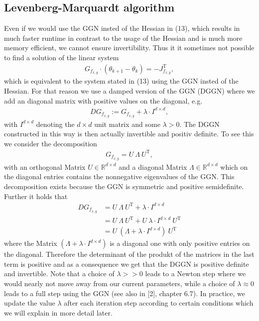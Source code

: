 \documentclass[conference]{IEEEtran}
\begin{document}
\subsection{Levenberg-Marquardt algorithm }
Even if we would use the GGN insted of the Hessian in (13), which results in much faster runtime in contrast to the usage of the Hessian and is much more memory efficient, we cannot ensure invertibility. Thus it it sometimes not possible to find a solution of the linear system
\begin{align}
G_{f_{x, y}}\cdot(\theta_{k+1} - \theta_{k}) = -J_{f_{x, y}}^{\mathrm{T}},
\end{align}
which is equivalent to the system stated in (13) using the GGN insted of the Hessian.
For that reason we use a damped version of the GGN (DGGN) where we add an diagonal matrix with positive values on the diagonal, e.g.
\begin{align}
DG_{f_{x, y}} := G_{f_{x, y}} + \lambda\cdot I^{d\times d},
\end{align}
with $I^{d\times d}$ denoting the $d\times d$ unit matrix and some $\lambda>0$.
The DGGN constructed in this way is then actually invertible and positiv definite. 
To see this we consider the decomposition
\begin{align}
G_{f_{x, y}} = U\:\Lambda\:U^{\mathrm{T}},
\end{align}
with an orthogonal Matrix $U\in\mathbb{R}^{d\times d}$ and a diagonal Matrix $\Lambda\in\mathbb{R}^{d\times d}$ which on the diagonal entries contains the nonnegative eigenvalues of the GGN. This decomposition exists because the GGN is symmetric and positive semidefinite. Further it holds that
\begin{align}
DG_{f_{x, y}} &= U\:\Lambda\:U^{\mathrm{T}} + \lambda\cdot I^{d\times d}\\
&= U\:\Lambda\:U^{\mathrm{T}} + U\:\lambda\cdot I^{d\times d}\:U^{\mathrm{T}}\\
&= U\:\left(\Lambda + \lambda\cdot I^{d\times d}\right)\:U^{\mathrm{T}}
\end{align}
where the Matrix $\left(\Lambda + \lambda\cdot I^{d\times d}\right)$ is a diagonal one with only positive entries on the diagonal. Therefore the determinant of the produkt of the matrices in the last term is positive and as a consequence we get that the DGGN is positive definite and invertible.
Note that a choice of $\lambda>>0$ leads to a Newton step where we would nearly not move away from our current parameters, while a choice of $\lambda\approx 0$ leads to a full step using the GGN (see also in [2], chapter 6.7). In practice, we update the value $\lambda$ after each iteration step according to certain conditions which we will explain in more detail later.
\end{document}
